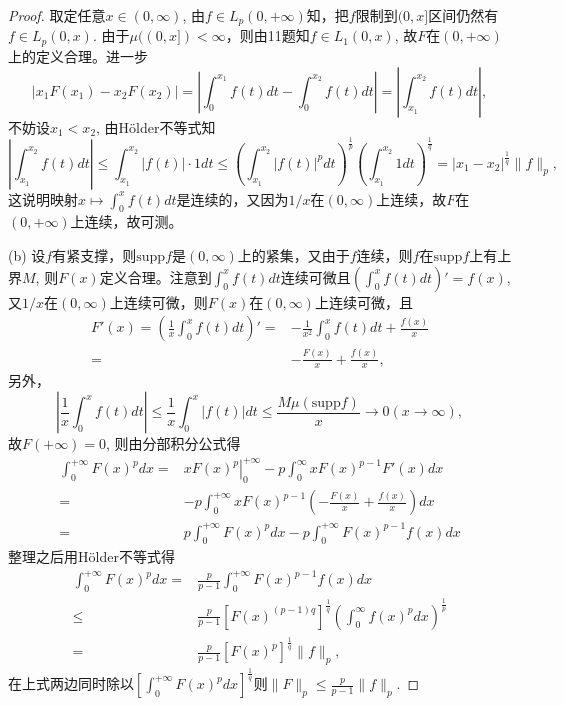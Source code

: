 \documentclass[a4paper,8pt]{ctexart}\textwidth 140mm \textheight 216mm
\newcommand{\8}{\infty}
\begin{document}
\begin{proof}
	取定任意$x\in(0,\infty)$, 由$f\in L_p(0,+\infty)$知，把$f$限制到$(0,x]$区间仍然有$f\in L_p(0,x)$. 由于$\mu((0,x])<\infty$，则由11题知$f\in L_1(0,x)$, 故$F$在$(0,+\infty)$上的定义合理。进一步
	\begin{equation*}
		|x_1F(x_1)-x_2F(x_2)|=|\int_0^{x_1}f(t)dt-\int_0^{x_2}f(t)dt|=|\int_{x_1}^{x_2}f(t)dt|,
	\end{equation*}
	不妨设$x_1<x_2$, 由H\"older不等式知
	\begin{equation*}
		|\int_{x_1}^{x_2}f(t)dt|\leq \int_{x_1}^{x_2}|f(t)|\cdot 1dt\leq (\int_{x_1}^{x_2}|f(t)|^pdt)^{\frac{1}{p}}(\int_{x_1}^{x_2}1dt)^{\frac{1}{q}}=|x_1-x_2|^{\frac{1}{q}}\|f\|_p,
	\end{equation*}
	这说明映射$x\mapsto\int_0^xf(t)dt$是连续的，又因为$1/x$在$(0,\infty)$上连续，故$F$在$(0,+\infty)$上连续，故可测。
	
	(b) 设$f$有紧支撑，则$\mathrm{supp} f$是$(0,\infty)$上的紧集，又由于$f$连续，则$f$在$\mathrm{supp}f$上有上界$M$, 则$F(x)$定义合理。注意到$\int_0^xf(t)dt$连续可微且$(\int_0^xf(t)dt)'=f(x)$, 又$1/x$在$(0,\infty)$上连续可微，则$F(x)$在$(0,\infty)$上连续可微，且
	\begin{equation*}
		\begin{split}
			F'(x)=(\frac{1}{x}\int_0^xf(t)dt)'=&-\frac{1}{x^2}\int_0^xf(t)dt+\frac{f(x)}{x}\\
			=&-\frac{F(x)}{x}+\frac{f(x)}{x},
		\end{split}
	\end{equation*}
	另外，
	\begin{equation*}
		|\frac{1}{x}\int_0^xf(t)dt|\leq \frac{1}{x}\int_0^x|f(t)|dt\leq \frac{M\mu(\mathrm{supp}f)}{x}\to 0(x\to\infty),
	\end{equation*}
	故$F(+\infty)=0$, 则由分部积分公式得
	\begin{equation*}
	\begin{split}
			\int_0^{+\infty}F(x)^pdx=&\left.xF(x)^p\right|_0^{+\infty}-p\int_0^{\infty}xF(x)^{p-1}F'(x)dx\\
			=&-p\int_0^{+\infty}xF(x)^{p-1}\left(-\frac{F(x)}{x}+\frac{f(x)}{x}\right)dx\\
			=&p\int_0^{+\infty}F(x)^pdx-p\int_0^{+\infty}F(x)^{p-1}f(x)dx
	\end
	{split}
	\end{equation*}
	整理之后用H\"older不等式得
	\begin{equation*}
	\begin{split}
	\int_0^{+\infty}F(x)^pdx=&\frac{p}{p-1}\int_0^{+\infty}F(x)^{p-1}f(x)dx\\
	\leq& \frac{p}{p-1}[F(x)^{(p-1)q}]^{\frac{1}{q}}(\int_0^\infty f(x)^pdx)^{\frac{1}{p}}\\
	=&\frac{p}{p-1}[F(x)^{p}]^{\frac{1}{q}}\|f\|_p,
	\end{split}
	\end{equation*}
	在上式两边同时除以$[\int_0^{+\infty}F(x)^pdx]^{\frac{1}{q}}$则$	\|F\|_p\leq \frac{p}{p-1}\|f\|_p$.
	

\end{proof}
\end{document}
